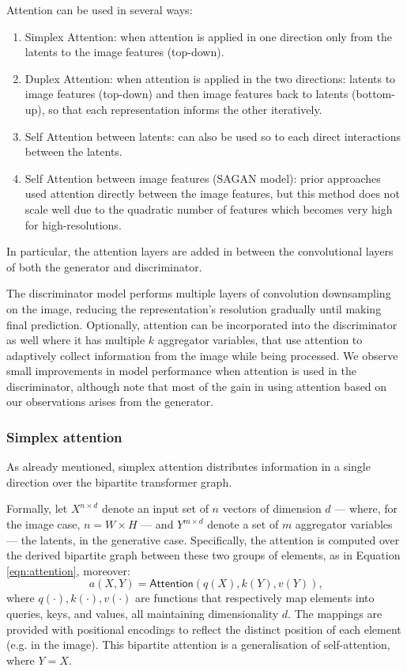 \documentclass{article}
\begin{document}
	Attention can be used in several ways: 
	\begin{enumerate}
		\item Simplex Attention: when attention is applied in one direction only from the latents to the 
		image features (top-down).
		\item Duplex Attention: when attention is applied in the two directions: latents to image features 
		(top-down) and then image features back to latents (bottom-up), so that each representation 
		informs the other iteratively.
		\item Self Attention between latents: can also be used so to each direct interactions between the 
		latents.
		\item Self Attention between image features (SAGAN model): prior approaches used attention 
		directly 
		between the image features, but this method does not scale well due to the quadratic number of 
		features which becomes very high for high-resolutions.
	\end{enumerate}

	In particular, the attention layers are added in between the convolutional layers of both the 
	generator and discriminator.
	
	The discriminator model performs multiple layers of convolution downsampling on the image, 
	reducing the representation's resolution gradually until making final prediction. 
	Optionally, attention can be incorporated into the discriminator as well where it has multiple $k$ 
	aggregator variables, that use attention to adaptively collect information from the image while being 
	processed. We observe small improvements in model performance when attention is used in the 
	discriminator, although note that most of the gain in using attention based on our observations 
	arises from the generator.
	
	
	\subsubsection{Simplex attention}%
	As already mentioned, simplex attention distributes information in a single direction over the 
	bipartite transformer graph. 
	
	Formally, let $X^{n\times d}$ denote an input set of $n$ vectors of dimension $d$ — where, for the 
	image case, $n = W\times H$ — and $Y^{m\times d}$ denote a set of $m$ aggregator variables — 
	the latents, in the generative case. Specifically, the attention is computed over the derived bipartite 
	graph between these two groups of elements, as in Equation \eqref{eqn:attention}, moreover:
	\begin{equation}
		\label{eqn:attention2}
		a(X,Y)=\mathsf{Attention}(q(X), k(Y), v(Y)) \mbox{,}
	\end{equation}
	where $q(\cdot), k(\cdot), v(\cdot)$ are functions that respectively map elements into queries, 
	keys, and values, all maintaining dimensionality $d$. 
	The mappings are provided with positional encodings to reflect the distinct position of each element 
	(e.g. in the image). This bipartite attention is a generalisation of self-attention, where $Y = X$.
	
\end{document}
